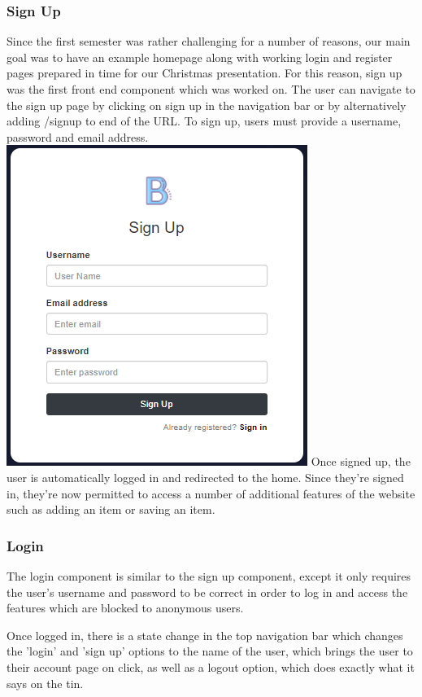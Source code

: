 \subsubsection{Sign Up}
Since the first semester was rather challenging for a number of reasons, our main goal was to have an example homepage along with working login and register pages prepared in time for our Christmas presentation. For this reason, sign up was the first front end component which was worked on. \newline
The user can navigate to the sign up page by clicking on sign up in the navigation bar or by alternatively adding /signup to end of the URL. To sign up, users must provide a username, password and email address. 
\newline
\includegraphics{img/fe_signup.png}
\newline
Once signed up, the user is automatically logged in and redirected to the home. Since they're signed in, they're now permitted to access a number of additional features of the website such as adding an item or saving an item.  

\subsubsection{Login}
The login component is similar to the sign up component, except it only requires the user's username and password to be correct in order to log in and access the features which are blocked to anonymous users. 

Once logged in, there is a state change in the top navigation bar which changes the 'login' and 'sign up' options to the name of the user, which brings the user to their account page on click, as well as a logout option, which does exactly what it says on the tin.

